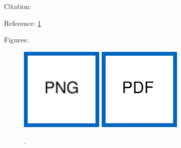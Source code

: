 \documentclass[RAIstudentexpose%
              ,optBiber%
              ,optBibstyleAlphabetic%
              ,optEnglish%
              ]{RAIlatex}%
\begin{document}
\section{}

%
%
Citation: \cite{choset2005principles, thrun2005probabilistic}\par%
Reference: \cref{fig:MyImage}\par%
Figures:\par%
\begin{figure}[htb]%
    \centering%
    \includegraphics[width=40mm]{figures/ImagePNG.png}%
    \hspace*{5mm}%
    \includegraphics[width=40mm]{figures/ImagePDF.pdf}\par%
    \begingroup%
        \resizebox{40mm}{!}{}%
    \endgroup%
    \hspace*{5mm}%
    \begingroup%
        \def\svgwidth{40mm}%
        \fontsize{25}{25}\selectfont%
    \endgroup%
    \caption{.}%
    \label{fig:MyImage}%
\end{figure}%
\Blindtext%
%
%
\end{document}
